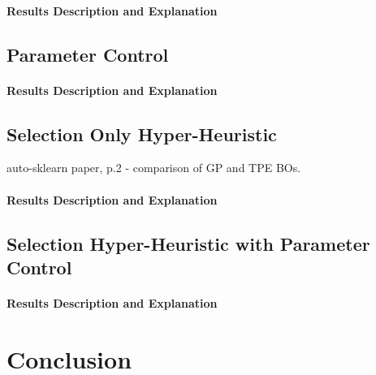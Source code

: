 \paragraph{Results Description and Explanation}


\subsection{Parameter Control}

\paragraph{Results Description and Explanation}


\subsection{Selection Only Hyper-Heuristic}
auto-sklearn paper, p.2 - comparison of GP and TPE BOs.

\paragraph{Results Description and Explanation}


\subsection{Selection Hyper-Heuristic with Parameter Control}

\paragraph{Results Description and Explanation}

\section{Conclusion}
